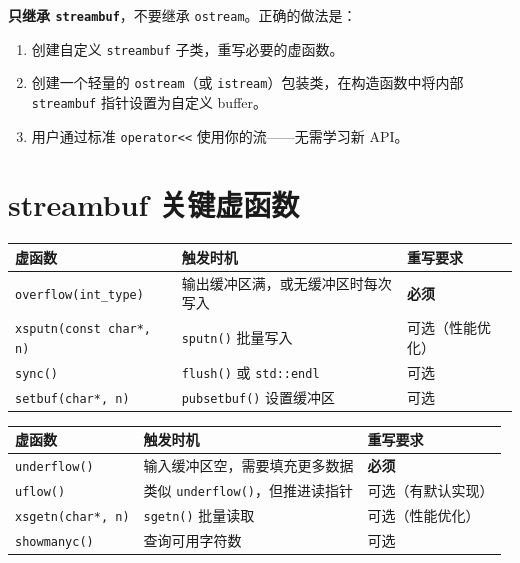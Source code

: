 \documentclass[12pt,a4paper,fontset=fandol]{ctexbook}
\newcommand{\Fn}[1]{\texttt{#1()}}
\newcommand{\Tp}[1]{\texttt{#1}}
\begin{document}
\begin{guideline}[title=自定义流的核心原则]
\textbf{只继承 \Tp{streambuf}}，不要继承 \Tp{ostream}。正确的做法是：
\begin{enumerate}
\item 创建自定义 \Tp{streambuf} 子类，重写必要的虚函数。
\item 创建一个轻量的 \Tp{ostream}（或 \Tp{istream}）包装类，在构造函数中将内部 \Tp{streambuf} 指针设置为自定义 buffer。
\item 用户通过标准 \Tp{operator<<} 使用你的流——无需学习新 API。
\end{enumerate}
\end{guideline}

\section{streambuf 关键虚函数}

\begin{compare}[title=输出方向的关键虚函数]
\begin{tabularx}{\textwidth}{lXX}
\toprule
\textbf{虚函数} & \textbf{触发时机} & \textbf{重写要求} \\
\midrule
\Tp{overflow(int\_type)} & 输出缓冲区满，或无缓冲区时每次写入 & \textbf{必须} \\
\Tp{xsputn(const char*, n)} & \Tp{sputn()} 批量写入 & 可选（性能优化） \\
\Tp{sync()} & \Tp{flush()} 或 \Tp{std::endl} & 可选 \\
\Tp{setbuf(char*, n)} & \Tp{pubsetbuf()} 设置缓冲区 & 可选 \\
\bottomrule
\end{tabularx}
\end{compare}

\begin{compare}[title=输入方向的关键虚函数]
\begin{tabularx}{\textwidth}{lXX}
\toprule
\textbf{虚函数} & \textbf{触发时机} & \textbf{重写要求} \\
\midrule
\Tp{underflow()} & 输入缓冲区空，需要填充更多数据 & \textbf{必须} \\
\Tp{uflow()} & 类似 \Fn{underflow}，但推进读指针 & 可选（有默认实现） \\
\Tp{xsgetn(char*, n)} & \Tp{sgetn()} 批量读取 & 可选（性能优化） \\
\Tp{showmanyc()} & 查询可用字符数 & 可选 \\
\bottomrule
\end{tabularx}
\end{compare}
\end{document}
